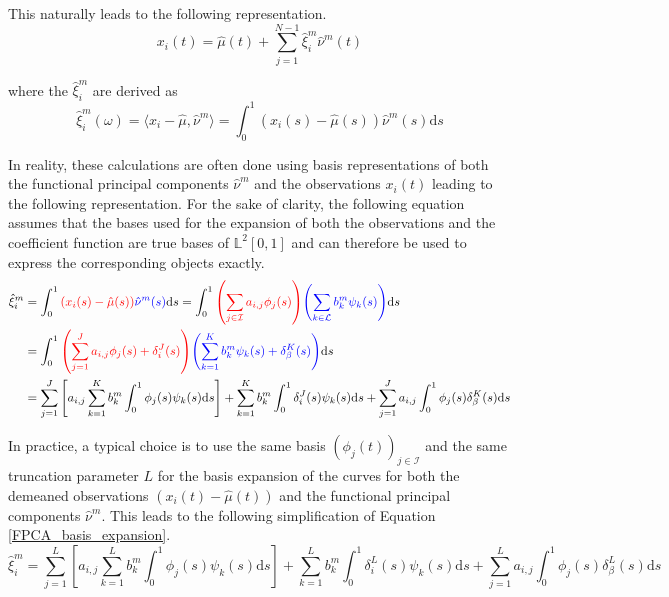 \documentclass[11pt,twoside,a4paper]{article}
\begin{document}
	This naturally leads to the following representation.
	\begin{equation}
		x_i(t) = \hat{\mu}(t) + \sum_{j = 1}^{N-1} \hat{\xi}_{i}^{m} \hat{\nu}^{m}(t)
	\end{equation}

	where the $\hat{\xi}_{i}^m$ are derived as 
	\begin{equation}
		\hat{\xi}_i^m(\omega) = \langle x_i - \hat{\mu}, \hat{\nu}^m\rangle = \int_{0}^{1} \left(x_i(s) - \hat{\mu}(s)\right) \hat{\nu}^m(s) \mathrm{d}s
	\end{equation}
	
	In reality, these calculations are often done using basis representations of both the functional principal components $\hat{\nu}^m$ and the observations $x_i(t)$ leading to the following representation. For the sake of clarity, the following equation assumes that the bases used for the expansion of both the observations and the coefficient function are true bases of $\mathbb{L}^2[0,1]$ and can therefore be used to express the corresponding objects exactly.
	\begin{equation}\label{FPCA_basis_expansion}
		\begin{split}
			\hat{\xi}_{i}^m & = \int_{0}^{1} {\color{red}\left( x_i(s) - \hat{\mu}(s)\right)} {\color{blue}\hat{\nu}^m(s)} \mathrm{d}s
			= \int_{0}^{1} {\color{red}\left(\sum_{j \in \mathcal{I}} a_{i,j} \phi_j(s)\right)} {\color{blue}\left(\sum_{k \in \mathcal{L}} b_{k}^m \psi_{k}(s)\right)} \mathrm{d}s \\
			& = \int_{0}^{1} {\color{red}\left(\sum_{j = 1}^{J} a_{i,j} \phi_j(s) + \delta_i^J(s)\right)} {\color{blue}\left(\sum_{k = 1}^{K} b_{k}^m \psi_{k}(s) + \delta_{\beta}^K(s)\right)} \mathrm{d}s \\
			& = \sum_{j = 1}^{J} \left[a_{i,j}\sum_{k = 1}^{K} b_{k}^m \int_{0}^{1} \phi_j(s) \psi_{k}(s)\mathrm{d}s \right] +  \sum_{k = 1}^{K} b_{k}^m \int_{0}^{1} \delta_i^J(s) \psi_{k}(s) \mathrm{d}s + \sum_{j = 1}^{J} a_{i,j} \int_{0}^{1}\phi_j(s) \delta_{\beta}^K(s) \mathrm{d}s
		\end{split}
	\end{equation}
	
	In practice, a typical choice is to use the same basis $\left(\phi_j(t)\right)_{j \in \mathcal{I}}$ and the same truncation parameter $L$ for the basis expansion of the curves for both the demeaned observations $\left(x_i(t) - \hat{\mu}(t)\right)$ and the functional principal components $\hat{\nu}^m$. This leads to the following simplification of Equation \ref{FPCA_basis_expansion}.
	\begin{equation}\label{score_approx}
			\hat{\xi}_{i}^m = \sum_{j = 1}^{L} \left[a_{i,j}\sum_{k = 1}^{L} b_{k}^m \int_{0}^{1} \phi_j(s) \psi_{k}(s)\mathrm{d}s \right] +  \sum_{k = 1}^{L} b_{k}^m \int_{0}^{1} \delta_i^L(s) \psi_{k}(s) \mathrm{d}s + \sum_{j = 1}^{L} a_{i,j} \int_{0}^{1}\phi_j(s) \delta_{\beta}^L(s) \mathrm{d}s
	\end{equation}
\end{document}
